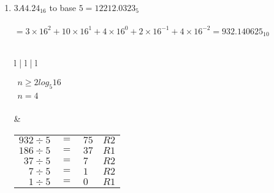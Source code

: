 \documentclass[12pt]{article}
\begin{document}
\begin{enumerate}
\begin{tabular}{l | l | l}
        $\begin{aligned}
            n \geq 2log_{8}13 \\
            n = 3 \\
        \end{aligned}$

        &

        \begin{tabular}{r c l l}
            $602 \div 8$ & $=$ & $75$ & $R2$ \\
            $75 \div 8$  & $=$ & $9$ & $R3$  \\
            $9 \div 8$   & $=$ & $1$ & $R1$  \\
            $1 \div 8$   & $=$ & $0$ & $R1$  \\
        \end{tabular}

        &

        \begin{tabular}{r c l l}
            $8 \times .177514792$ & $=$ & $1 + .420118336$ & \\
            $8 \times .420118336$ & $=$ & $3 + .360946688$ & \\
            $8 \times .360946688$ & $=$ & $2 + .887573504$ & round up \\
        \end{tabular}
        

     \end{tabular}

     \item $3A4.24_{16}$ to base $5 = \boxed{12212.0323_{5}}$ \\ \\
     $ = 3 \times 16^2 + 10 \times 16^1 + 4 \times 16^0 + 2 \times 16^{-1} + 4 \times 16^{-2} = 932.140625_{10}$ \\\\
     \begin{tabular}{l | l | l}
         

        $\begin{aligned}
            n \geq 2log_{5}16 \\
            n = 4 \\
        \end{aligned}$

        &

        \begin{tabular}{r c l l}
            $932 \div 5$ & $=$ & $75$ & $R2$ \\
            $186 \div 5$  & $=$ & $37$ & $R1$  \\
            $37 \div 5$   & $=$ & $7$ & $R2$  \\
            $7 \div 5$   & $=$ & $1$ & $R2$  \\
            $1 \div 5$   & $=$ & $0$ & $R1$  \\
        \end{tabular}


\end{tabular}
\end{enumerate}
\end{document}
